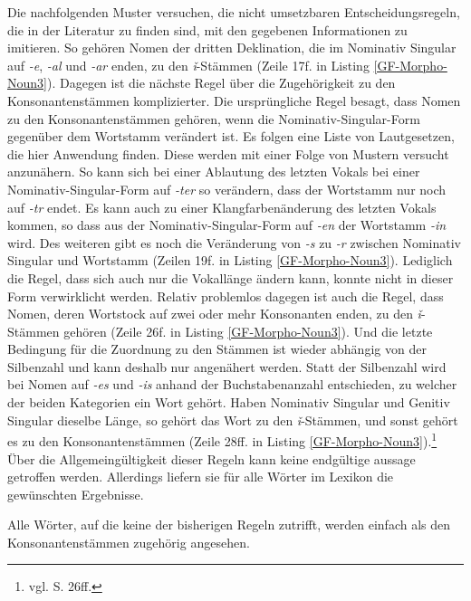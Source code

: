 Die nachfolgenden Muster versuchen, die nicht umsetzbaren Entscheidungsregeln, die in der Literatur zu finden sind, mit den gegebenen Informationen zu imitieren. So gehören Nomen der dritten Deklination, die im Nominativ Singular auf \textit{-e}, \textit{-al} und \textit{-ar} enden, zu den \textit{ǐ}-Stämmen (Zeile 17f. in Listing \ref{GF-Morpho-Noun3}). Dagegen ist die nächste Regel über die Zugehörigkeit zu den Konsonantenstämmen komplizierter. Die ursprüngliche Regel besagt, dass Nomen zu den Konsonantenstämmen gehören, wenn die Nominativ-Singular-Form gegenüber dem Wortstamm verändert ist. Es folgen eine Liste von Lautgesetzen, die hier Anwendung finden. Diese werden mit einer Folge von Mustern versucht anzunähern. So kann sich bei einer Ablautung des letzten Vokals bei einer Nominativ-Singular-Form auf \textit{-ter} so verändern, dass der Wortstamm nur noch auf \textit{-tr} endet. Es kann auch zu einer Klangfarbenänderung des letzten Vokals kommen, so dass aus der Nominativ-Singular-Form auf \textit{-en} der Wortstamm \textit{-in} wird. Des weiteren gibt es noch die Veränderung von \textit{-s} zu \textit{-r} zwischen Nominativ Singular und Wortstamm (Zeilen 19f. in Listing \ref{GF-Morpho-Noun3}). Lediglich die Regel, dass sich auch nur die Vokallänge ändern kann, konnte nicht in dieser Form verwirklicht werden. Relativ problemlos dagegen ist auch die Regel, dass Nomen, deren Wortstock auf zwei oder mehr Konsonanten enden, zu den \textit{ǐ}-Stämmen gehören (Zeile 26f. in Listing \ref{GF-Morpho-Noun3}). Und die letzte Bedingung für die Zuordnung zu den Stämmen ist wieder abhängig von der Silbenzahl und kann deshalb nur angenähert werden. Statt der Silbenzahl wird bei Nomen auf \textit{-es} und \textit{-is} anhand der Buchstabenanzahl entschieden, zu welcher der beiden Kategorien ein Wort gehört. Haben Nominativ Singular und Genitiv Singular dieselbe Länge, so gehört das Wort zu den \textit{ǐ}-Stämmen, und sonst gehört es zu den Konsonantenstämmen (Zeile 28ff. in Listing \ref{GF-Morpho-Noun3}).\footnote{vgl. \cite{BAYER-LINDAUER1994} S. 26ff.} Über die Allgemeingültigkeit dieser Regeln kann keine endgültige aussage getroffen werden. Allerdings liefern sie für alle Wörter im Lexikon die gewünschten Ergebnisse.\par
Alle Wörter, auf die keine der bisherigen Regeln zutrifft, werden einfach als den Konsonantenstämmen zugehörig angesehen. \par
